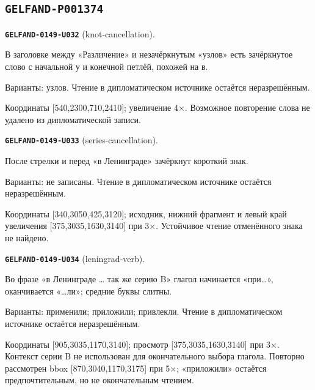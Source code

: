 \documentclass[11pt]{article}
\theoremstyle{definition}
\theoremstyle{remark}
\begin{document}
\subsection*{\texttt{GELFAND-P001374}}
\noindent\leavevmode{}\label{GELFAND-P001374:knot-cancellation:note}\textbf{\texttt{GELFAND-0149-U032}} (knot-cancellation).\par\nopagebreak[4]
В заголовке между «Различение» и незачёркнутым «узлов» есть зачёркнутое слово с начальной у и конечной петлёй, похожей на в.\par
Варианты: узлов. Чтение в дипломатическом источнике остаётся неразрешённым.\par
Координаты [540,2300,710,2410]; увеличение 4×. Возможное повторение слова не удалено из дипломатической записи.\par\medskip
\noindent\leavevmode{}\label{GELFAND-P001374:series-cancellation:note}\textbf{\texttt{GELFAND-0149-U033}} (series-cancellation).\par\nopagebreak[4]
После стрелки и перед «в Ленинграде» зачёркнут короткий знак.\par
Варианты: не записаны. Чтение в дипломатическом источнике остаётся неразрешённым.\par
Координаты [340,3050,425,3120]; исходник, нижний фрагмент и левый край увеличения [375,3035,1630,3140] при 3×. Устойчивое чтение отменённого знака не найдено.\par\medskip
\noindent\leavevmode{}\label{GELFAND-P001374:leningrad-verb:note}\textbf{\texttt{GELFAND-0149-U034}} (leningrad-verb).\par\nopagebreak[4]
Во фразе «в Ленинграде … так же серию B» глагол начинается «при…», оканчивается «…ли»; средние буквы слитны.\par
Варианты: применили; приложили; привлекли. Чтение в дипломатическом источнике остаётся неразрешённым.\par
Координаты [905,3035,1170,3140]; просмотр [375,3035,1630,3140] при 3×. Контекст серии B не использован для окончательного выбора глагола. Повторно рассмотрен bbox [870,3040,1170,3175] при 5×; «приложили» остаётся предпочтительным, но не окончательным чтением.\par\medskip
\end{document}
